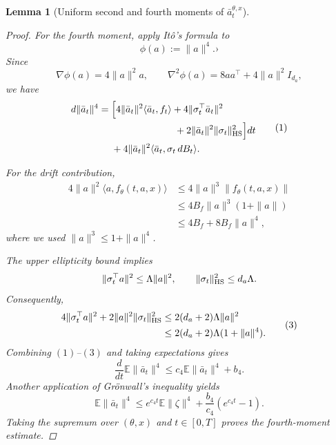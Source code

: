\documentclass{article}
\newtheorem{lem}[thm]{Lemma}
\theoremstyle{definition}
\theoremstyle{remark}
\theoremstyle{mystyle}
\newcommand{\1}{\mathbbm{1}}
\begin{document}
\begin{lem}[Uniform second and fourth moments of
\(\bar a_t^{\theta,x}\)]
\begin{proof}
For the fourth moment, apply It\^o's formula to
\[
\phi(a):=\|a\|^4.
›\]
Since
\[
\nabla\phi(a)=4\|a\|^2a,
\qquad
\nabla^2\phi(a)
=
8aa^\top+4\|a\|^2I_{d_a},
\]
we have
\[
\begin{aligned}
d\|\bar a_t\|^4
={}&
\Big[
4\|\bar a_t\|^2\langle\bar a_t,f_t\rangle
+
4\|\sigma_t^\top\bar a_t\|^2\\
&\hspace{23mm}
+
2\|\bar a_t\|^2\|\sigma_t\|_{\rm HS}^2
\Big]dt\\
&+
4\|\bar a_t\|^2
\langle\bar a_t,\sigma_t\,dB_t\rangle.
\end{aligned}
\tag{1}
\]

For the drift contribution,
\[
\begin{aligned}
4\|a\|^2\langle a,f_\theta(t,a,x)\rangle
&\le
4\|a\|^3\|f_\theta(t,a,x)\|\\
&\le
4B_f\|a\|^3(1+\|a\|)\\
&\le
4B_f+8B_f\|a\|^4,
\end{aligned}
\tag{2}
\]
where we used \(\|a\|^3\le 1+\|a\|^4\).

The upper ellipticity bound implies
\[
\|\sigma_t^\top a\|^2
\le \Lambda\|a\|^2,
\qquad
\|\sigma_t\|_{\rm HS}^2
\le d_a\Lambda.
\]
Consequently,
\[
\begin{aligned}
4\|\sigma_t^\top a\|^2
+
2\|a\|^2\|\sigma_t\|_{\rm HS}^2
&\le
2(d_a+2)\Lambda\|a\|^2\\
&\le
2(d_a+2)\Lambda(1+\|a\|^4).
\end{aligned}
\tag{3}
\]
Combining \((1)\)--\((3)\) and taking expectations gives
\[
\frac{d}{dt}\mathbb E\|\bar a_t\|^4
\le
c_4\mathbb E\|\bar a_t\|^4+b_4.
\]
Another application of Gr\"onwall's inequality yields
\[
\mathbb E\|\bar a_t\|^4
\le
e^{c_4t}\mathbb E\|\zeta\|^4
+
\frac{b_4}{c_4}\left(e^{c_4t}-1\right).
\]
Taking the supremum over \((\theta,x)\) and \(t\in[0,T]\) proves the
fourth-moment estimate.

\end{proof}
\end{lem}
\end{document}
